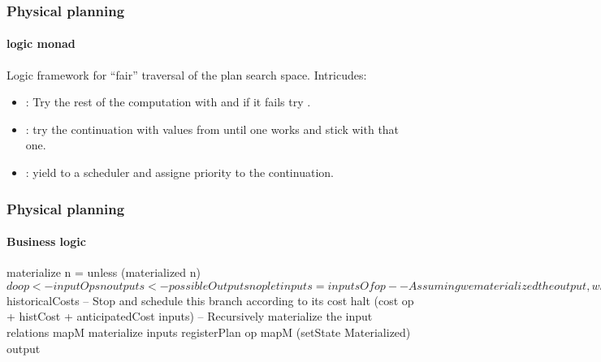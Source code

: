 \begin{frame}
  \frametitle{Physical planning}
  \framesubtitle{ logic monad}

  Logic framework for ``fair'' traversal of the plan search space. Intricudes:

  \begin{itemize}
  \item {}: Try the rest of the computation with 
    and if it fails try .
  \item {}: try the continuation with values from 
    until one works and stick with that one.
  \item {}: yield to a scheduler and assigne priority
     to the continuation.
  \end{itemize}
\end{frame}

\begin{frame}[fragile]
  \frametitle{Physical planning}
  \framesubtitle{Business logic}
  \begin{code}
    \begin{haskellcode}
    materialize n = unless (materialized n) $ do
      op <- inputOps n
      outputs <- possibleOutputs n op
      let inputs = inputsOf op
      -- Assuming we materialized the output, what is the cost of the
      -- outputs
      once (gc outputs)
      histCost <- withMaterialized outputs $ historicalCosts
      -- Stop and schedule this branch according to its cost
      halt (cost op + histCost + anticipatedCost inputs)
      -- Recursively materialize the input relations
      mapM materialize inputs
      registerPlan op
      mapM (setState Materialized) output
    \end{haskellcode}
  \end{code}
\end{frame}

